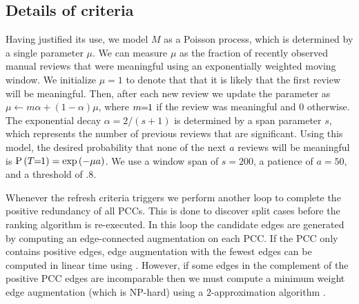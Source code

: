 \subsection{Details of criteria}

Having justified its use, we model $M$ as a Poisson process, which is determined by a single parameter $\mu$.
We can measure $\mu$ as the fraction of recently observed manual reviews that were meaningful using an
  exponentially weighted moving window.
We initialize $\mu=1$ to denote that that it is likely that the first review will be meaningful.
Then, after each new review we update the parameter as %
$\mu \leftarrow m \alpha + (1 - \alpha) \mu$, where $m\mkern-6mu=\mkern-6mu1$ if the review was meaningful and $0$ otherwise.
The exponential decay $\alpha = 2 / (s + 1)$ is determined by a span parameter $s$, which represents the number
  of previous reviews that are significant.
Using this model, the desired probability that none of the next $a$ reviews will be meaningful is %
$\mathbin{\mathbin{\operatorname{P}}}\left(T\mkern-6mu=\mkern-6mu1\right) = \textrm{exp}\left(-\mu  a\right)$.
We use a window span of $s=200$, a patience of $a=50$, and a threshold of $.8$.


Whenever the refresh criteria triggers we perform another loop to complete the positive redundancy of all PCCs.
This is done to discover split cases before the ranking algorithm is re-executed.
In this loop the candidate edges are generated by computing an edge-connected augmentation on each PCC.
If the PCC only contains positive edges, edge augmentation with the fewest edges can be computed in linear time
  using \cite{eswaran_augmentation_1976}.
However, if some edges in the complement of the positive PCC edges are incomparable then we must compute a
  minimum weight edge augmentation (which is NP-hard) using a $2$-approximation algorithm
  \cite{khuller_approximation_1993}.
  






